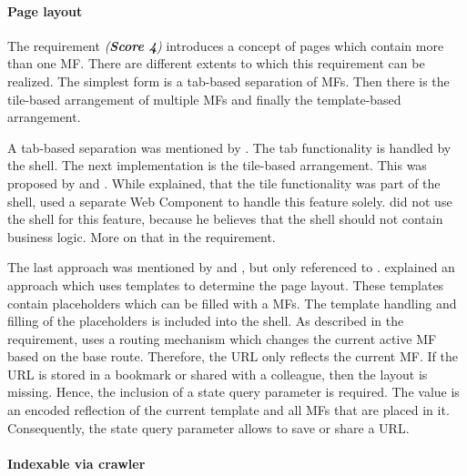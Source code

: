 \paragraph{Page layout}\label{cha:requirement_detail_integration_pagelayout}

The requirement \textit{ (\textbf{Score 4})} introduces a concept of pages which contain more than one \ac{MF}.
There are different extents to which this requirement can be realized.
The simplest form is a tab-based separation of \acp{MF}.
Then there is the tile-based arrangement of multiple \acp{MF} and finally the template-based arrangement.

A tab-based separation was mentioned by \textciteOlleck{}.
The tab functionality is handled by the shell.
The next implementation is the tile-based arrangement.
This was proposed by \citeauthorOlleck{} and \textcite{Laug.2018}.
While \citeauthorOlleck{} explained, that the tile functionality was part of the shell, \citeauthor{Laug.2018} used a separate Web Component to handle this feature solely.
\citeauthor{Laug.2018} did not use the shell for this feature, because he believes that the shell should not contain business logic.
More on that in the \textit{} requirement.

The last approach was mentioned by \textcite{Grijzen.2019} and \textciteMezzalira{}, but \citeauthorMezzalira{} only referenced to \citeauthor{Grijzen.2019}.
\citeauthor{Grijzen.2019} explained an approach which uses templates to determine the page layout.
These templates contain placeholders which can be filled with a \acp{MF}.
The template handling and filling of the placeholders is included into the shell.
As described in the \textit{} requirement, \citeauthor{Grijzen.2019} uses a routing mechanism which changes the current active \ac{MF} based on the base route.
Therefore, the \ac{URL} only reflects the current \ac{MF}.
If the \ac{URL} is stored in a bookmark or shared with a colleague, then the layout is missing.
Hence, the inclusion of a state query parameter is required.
The value is an encoded reflection of the current template and all \acp{MF} that are placed in it.
Consequently, the state query parameter allows to save or share a \ac{URL}.



\paragraph{Indexable via crawler}\label{cha:requirement_detail_integration_crawler}

